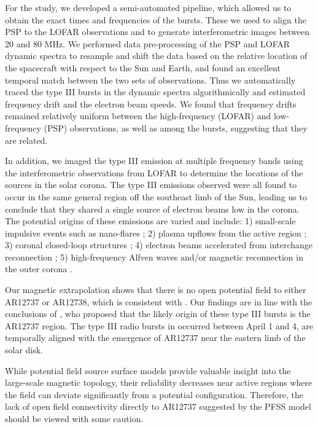 For the study, we developed a semi-automated pipeline, which allowed us to obtain the exact times and frequencies of the bursts. These we used to align the PSP to the LOFAR observations and to generate interferometric images between 20 and 80 MHz. We performed data pre-processing of the PSP and LOFAR dynamic spectra to resample and shift the data based on the relative location of the spacecraft with respect to the Sun and Earth, and found an excellent temporal match between the two sets of observations. Thus we automatically traced the type III bursts in the dynamic spectra algorithmically and estimated frequency drift and the electron beam speeds. We found that frequency drifts remained relatively uniform between the high-frequency (LOFAR) and low-frequency (PSP) observations, as well as among the bursts, suggesting that they are related.

In addition, we imaged the type III emission at multiple frequency bands using the interferometric observations from LOFAR to determine the locations of the sources in the solar corona. The type III emissions observed were all found to occur in the same general region off the southeast limb of the Sun, leading us to conclude that they shared a single source of electron beams low in the corona.
The potential origins of these emissions are varied and include: 1) small-scale impulsive events such as nano-flares \citep{ishikawa_2017, che_2018, chhabra_2021}; 2) plasma upflows from the active region \citep{harra_2021}; 3) coronal closed-loop structures \citep{Wu_2002}; 4) electron beams accelerated from interchange reconnection \citep{gopalswamy_2022}; 5) high-frequency Alfven waves and/or magnetic reconnection in the outer corona \citep{morton_2015, khaled_2022}.

Our magnetic extrapolation shows that there is no open potential field to either AR12737 or AR12738, which is consistent with \citet{cattell_2021}. Our findings are in line with the conclusions of \citet{harra_2021}, who proposed that the likely origin of these type III bursts is the AR12737 region. The type III radio bursts in \citet{harra_2021} occurred between April 1 and 4, are temporally aligned with the emergence of AR12737 near the eastern limb of the solar disk.

While potential field source surface models provide valuable insight into the large-scale magnetic topology, their reliability decreases near active regions where the field can deviate significantly from a potential configuration. Therefore, the lack of open field connectivity directly to AR12737 suggested by the PFSS model should be viewed with some caution.

